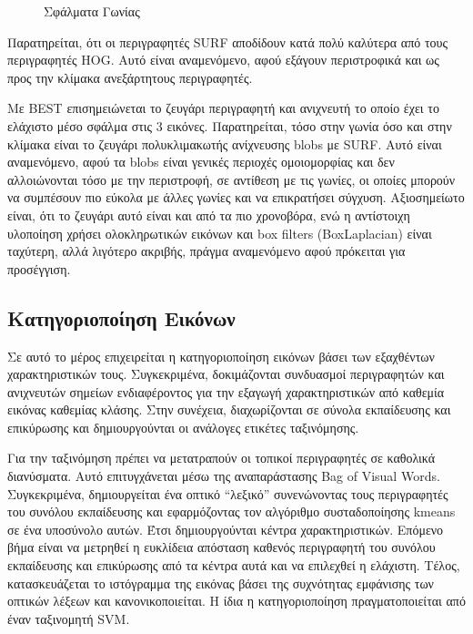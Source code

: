 \documentclass{article}
\newcommand{\eng}[1]{\foreignlanguage{english}{#1}}
\begin{document}
\begin{figure}[h]
    
    \caption{Σφάλματα Γωνίας}
\end{figure}
\FloatBarrier

Παρατηρείται, ότι οι περιγραφητές \eng{SURF} αποδίδουν κατά πολύ καλύτερα από τους περιγραφητές \eng{HOG}. Αυτό είναι αναμενόμενο, αφού εξάγουν περιστροφικά και ως προς την κλίμακα ανεξάρτητους περιγραφητές.

Με \eng{BEST} επισημειώνεται το ζευγάρι περιγραφητή και ανιχνευτή το οποίο έχει το ελάχιστο μέσο σφάλμα στις 3 εικόνες. Παρατηρείται, τόσο στην γωνία όσο και στην κλίμακα είναι το ζευγάρι πολυκλιμακωτής ανίχνευσης \eng{blobs} με \eng{SURF}. Αυτό είναι αναμενόμενο, αφού τα \eng{blobs} είναι γενικές περιοχές ομοιομορφίας και δεν αλλοιώνονται τόσο με την περιστροφή, σε αντίθεση με τις γωνίες, οι οποίες μπορούν να συμπέσουν πιο εύκολα με άλλες γωνίες και να επικρατήσει σύγχυση. Αξιοσημείωτο είναι, ότι το ζευγάρι αυτό είναι και από τα πιο χρονοβόρα, ενώ η αντίστοιχη υλοποίηση χρήσει ολοκληρωτικών εικόνων και \eng{box filters} (BoxLaplacian) είναι ταχύτερη, αλλά λιγότερο ακριβής, πράγμα αναμενόμενο αφού πρόκειται για προσέγγιση.

\subsection{Κατηγοριοποίηση Εικόνων}

Σε αυτό το μέρος επιχειρείται η κατηγοριοποίηση εικόνων βάσει των εξαχθέντων χαρακτηριστικών τους. Συγκεκριμένα, δοκιμάζονται συνδυασμοί περιγραφητών και ανιχνευτών σημείων ενδιαφέροντος για την εξαγωγή χαρακτηριστικών από καθεμία εικόνας καθεμίας κλάσης. Στην συνέχεια, διαχωρίζονται σε σύνολα εκπαίδευσης και επικύρωσης και δημιουργούνται οι ανάλογες ετικέτες ταξινόμησης. 

Για την ταξινόμηση πρέπει να μετατραπούν οι τοπικοί περιγραφητές σε καθολικά διανύσματα. Αυτό επιτυγχάνεται μέσω της αναπαράστασης \eng{Bag of Visual Words}. Συγκεκριμένα, δημιουργείται ένα οπτικό ``λεξικό'' συνενώνοντας τους περιγραφητές του συνόλου εκπαίδευσης και εφαρμόζοντας τον αλγόριθμο συσταδοποίησης \eng{kmeans} σε ένα υποσύνολο αυτών. Έτσι δημιουργούνται κέντρα χαρακτηριστικών. Επόμενο βήμα είναι να μετρηθεί η ευκλίδεια απόσταση καθενός περιγραφητή του συνόλου εκπαίδευσης και επικύρωσης από τα κέντρα αυτά και να επιλεχθεί η ελάχιστη. Τέλος, κατασκευάζεται το ιστόγραμμα της εικόνας βάσει της συχνότητας εμφάνισης των οπτικών λέξεων και κανονικοποιείται. Η ίδια η κατηγοριοποίηση πραγματοποιείται από έναν ταξινομητή \eng{SVM}.
\end{document}
